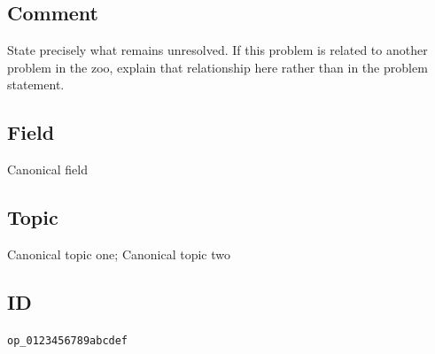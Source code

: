 \subsection*{Comment}

State precisely what remains unresolved.  If this problem is related to
another problem in the zoo, explain that relationship here rather than in the
problem statement.

\subsection*{Field}

Canonical field

\subsection*{Topic}

Canonical topic one; Canonical topic two

\subsection*{ID}

\texttt{op\_0123456789abcdef}
